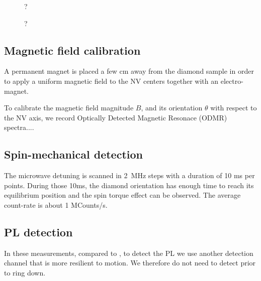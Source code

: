 \documentclass[preprintnumbers,amsmath,amssymb,onecolumn,12pt]{revtex4}
\begin{document}
\begin{figure}[!ht]
  \centering {}
  \caption{?}
	\label{Optics}
\end{figure}

\begin{figure}[!ht]
  \centering {}
  \caption{?}
	\label{Optics}
\end{figure}


\subsection{Magnetic field calibration}

A permanent magnet is placed a few cm away from the diamond sample in order to apply a uniform magnetic field to the NV centers together with an electro-magnet.

To calibrate the magnetic field magnitude $B$, and its orientation $\theta$ with respect to the NV axis, we record Optically Detected Magnetic Resonace (ODMR) spectra.... 



\subsection{Spin-mechanical detection}

The microwave detuning is scanned in 2~MHz steps with a duration of 10 ms per points. During those 10ms, the diamond orientation has enough time to reach its equilibrium position and the spin torque effect can be observed. The average count-rate is about 1 MCounts/s.

\subsection{PL detection}

In these measurements, compared to \cite{DelordNat}, to detect the PL we use another detection channel that is more resilient to motion. We therefore do not need to detect prior to ring down.



\end{document}
